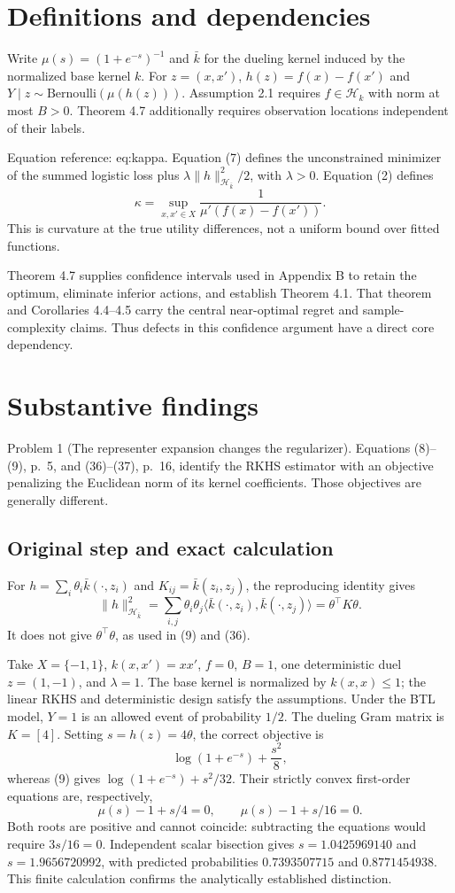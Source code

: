 \documentclass[10pt]{article}
\begin{document}
\section*{Definitions and dependencies}
Write \(\mu(s)=(1+e^{-s})^{-1}\) and \(\bar k\) for the dueling kernel induced by the normalized base kernel \(k\). For \(z=(x,x')\), \(h(z)=f(x)-f(x')\) and \(Y\mid z\sim\mathrm{Bernoulli}(\mu(h(z)))\). Assumption 2.1 requires \(f\in\mathcal H_k\) with norm at most \(B>0\). Theorem 4.7 additionally requires observation locations independent of their labels.\par
Equation reference: eq:kappa. Equation (7) defines the unconstrained minimizer of the summed logistic loss plus \(\lambda\|h\|_{\mathcal H_{\bar k}}^2/2\), with \(\lambda>0\). Equation (2) defines \[
\kappa=\sup_{x,x'\in X}\frac1{\mu'(f(x)-f(x'))}.\] This is curvature at the true utility differences, not a uniform bound over fitted functions.\par
Theorem 4.7 supplies confidence intervals used in Appendix B to retain the optimum, eliminate inferior actions, and establish Theorem 4.1. That theorem and Corollaries 4.4–4.5 carry the central near-optimal regret and sample-complexity claims. Thus defects in this confidence argument have a direct core dependency.\par
\section*{Substantive findings}
Problem 1 (The representer expansion changes the regularizer).  Equations (8)–(9), p. 5, and (36)–(37), p. 16, identify the RKHS estimator with an objective penalizing the Euclidean norm of its kernel coefficients. Those objectives are generally different.\par
\subsection*{Original step and exact calculation}
For \(h=\sum_i\theta_i\bar k(\cdot,z_i)\) and \(K_{ij}=\bar k(z_i,z_j)\), the reproducing identity gives \[\|h\|_{\mathcal H_{\bar k}}^2
=\sum_{i,j}\theta_i\theta_j
\langle\bar k(\cdot,z_i),\bar k(\cdot,z_j)\rangle
=\theta^\top K\theta.\] It does not give \(\theta^\top\theta\), as used in (9) and (36).\par
Take \(X=\{-1,1\}\), \(k(x,x')=xx'\), \(f=0\), \(B=1\), one deterministic duel \(z=(1,-1)\), and \(\lambda=1\). The base kernel is normalized by \(k(x,x)\le1\); the linear RKHS and deterministic design satisfy the assumptions. Under the BTL model, \(Y=1\) is an allowed event of probability \(1/2\). The dueling Gram matrix is \(K=[4]\). Setting \(s=h(z)=4\theta\), the correct objective is \[\log(1+e^{-s})+\frac{s^2}{8},\] whereas (9) gives \(\log(1+e^{-s})+s^2/32\). Their strictly convex first-order equations are, respectively, \[\mu(s)-1+s/4=0,\qquad \mu(s)-1+s/16=0.\] Both roots are positive and cannot coincide: subtracting the equations would require \(3s/16=0\). Independent scalar bisection gives \(s=1.0425969140\) and \(s=1.9656720992\), with predicted probabilities \(0.7393507715\) and \(0.8771454938\). This finite calculation confirms the analytically established distinction.\par
\end{document}
